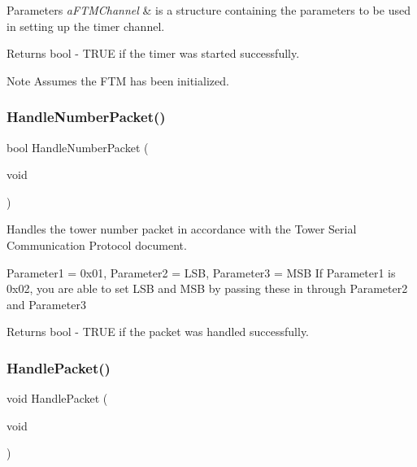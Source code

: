 \begin{DoxyParams}{Parameters}
{\em a\+F\+T\+M\+Channel} & is a structure containing the parameters to be used in setting up the timer channel. \\
\hline
\end{DoxyParams}
\begin{DoxyReturn}{Returns}
bool -\/ T\+R\+UE if the timer was started successfully. 
\end{DoxyReturn}
\begin{DoxyNote}{Note}
Assumes the F\+TM has been initialized. 
\end{DoxyNote}
\mbox{\label{group__main__module_gac86820f24fb68dfbb9d2a3b772af94b9}} 
\subsubsection{\texorpdfstring{Handle\+Number\+Packet()}{HandleNumberPacket()}}
{\footnotesize\ttfamily bool Handle\+Number\+Packet (\begin{DoxyParamCaption}\item[{void}]{ }\end{DoxyParamCaption})}



Handles the tower number packet in accordance with the Tower Serial Communication Protocol document. 

Parameter1 = 0x01, Parameter2 = L\+SB, Parameter3 = M\+SB If Parameter1 is 0x02, you are able to set L\+SB and M\+SB by passing these in through Parameter2 and Parameter3

\begin{DoxyReturn}{Returns}
bool -\/ T\+R\+UE if the packet was handled successfully. 
\end{DoxyReturn}
\mbox{\label{group__main__module_gab7a5cb735555819b24719d6078028181}} 
\subsubsection{\texorpdfstring{Handle\+Packet()}{HandlePacket()}}
{\footnotesize\ttfamily void Handle\+Packet (\begin{DoxyParamCaption}\item[{void}]{ }\end{DoxyParamCaption})}



